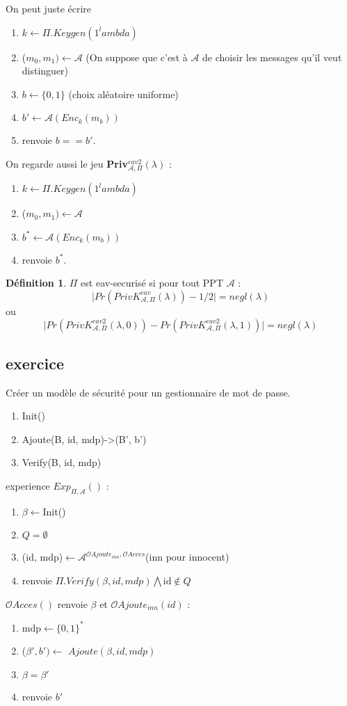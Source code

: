 \documentclass[12pt]{article}
\theoremstyle{plain}
\theoremstyle{definition}
\newtheorem{defn}[subsubsection]{D\'efinition}
\theoremstyle{remark}
\newcommand{\A}{\mathcal{A}}
\newcommand{\Or}{\mathcal{O}}
\begin{document}
On peut juste écrire
\begin{enumerate}
    \item $k\leftarrow \Pi.Keygen(1^lambda)$
    \item ($m_0,m_1)\leftarrow\A$ (On suppose que c'est à $\A$ de choisir les messages qu'il veut distinguer)
    \item $b\leftarrow\{0,1\}$ (choix aléatoire uniforme)
    \item $b'\leftarrow \A(Enc_k(m_b))$
    \item renvoie $b==b'$.
\end{enumerate}
On regarde aussi le jeu \textbf{Priv$_{\A,\Pi}^{eav2}(\lambda)$} :
\begin{enumerate}
    \item $k\leftarrow \Pi.Keygen(1^lambda)$
    \item ($m_0,m_1)\leftarrow\A$ 
    \item $b^*\leftarrow \A(Enc_k(m_b))$
    \item renvoie $b^*$.
\end{enumerate}

\begin{defn}
    $\Pi$ est eav-securisé si pour tout PPT $\A$ : 
    $$\lvert Pr(PrivK_{\A,\Pi}^{eav}(\lambda))-1/2\rvert=negl(\lambda)$$
    ou
    $$\lvert Pr(PrivK_{\A,\Pi}^{eav2}(\lambda,0))-Pr(PrivK_{\A,\Pi}^{eav2}(\lambda,1))\rvert=negl(\lambda)$$
\end{defn}

\subsection{exercice}
Créer un modèle de sécurité pour un gestionnaire de mot de passe.
\begin{enumerate}
    \item Init()
    \item Ajoute(B, id, mdp)->(B', b')
    \item Verify(B, id, mdp)
\end{enumerate}

experience $Exp_{\Pi,\A}()$ :
\begin{enumerate}
    \item $\beta\leftarrow$Init()
    \item $Q=\emptyset$
    \item (id, mdp)$\leftarrow\A^{\Or Ajoute_{inn},\Or Acces}$(inn pour innocent)
    \item renvoie $\Pi.Verify(\beta,id, mdp)$$\bigwedge$id$\notin Q$
\end{enumerate}
$\Or Acces()$ renvoie $\beta$ et $\Or Ajoute_{inn}(id)$ :
\begin{enumerate}
    \item mdp$\leftarrow\{0,1\}^*$
    \item ($\beta',b')\leftarrow$ $Ajoute(\beta,id,mdp)$
    \item $\beta=\beta'$
    \item renvoie $b'$
\end{enumerate}
\end{document}

